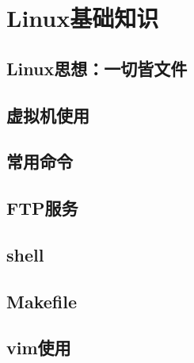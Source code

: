 \chapter{Linux基础知识}
\section{Linux思想：一切皆文件}


\section{虚拟机使用}


\section{常用命令}



\section{FTP服务}




\section{shell}





\section{Makefile}




\section{vim使用}





